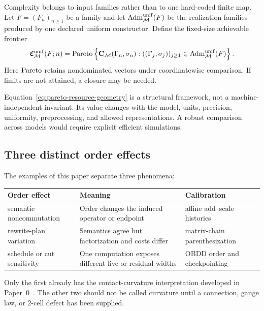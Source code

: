 Complexity belongs to input families rather than to one hard-coded finite map.
Let $F=(F_n)_{n\ge1}$ be a family and let
$\operatorname{Adm}^{\mathrm{unif}}_{\mathcal M}(F)$ be the realization families
produced by one declared uniform constructor.  Define the fixed-size achievable
frontier
\begin{equation}
 \mathfrak C_{\mathcal M}^{\mathrm{unif}}(F;n)
 =\operatorname{Pareto}\left\{
 \mathbf C_{\mathcal M}(\Gamma_n,\sigma_n):
 ((\Gamma_j,\sigma_j))_{j\ge1}
 \in\operatorname{Adm}^{\mathrm{unif}}_{\mathcal M}(F)
 \right\}.
 \label{eq:pareto-resource-geometry}
\end{equation}
Here $\operatorname{Pareto}$ retains nondominated vectors under coordinatewise comparison.
If limits are not attained, a closure may be needed.

Equation~\eqref{eq:pareto-resource-geometry} is a structural framework, not a
machine-independent invariant.  Its value changes with the model, units,
precision, uniformity, preprocessing, and allowed representations.  A robust
comparison across models would require explicit efficient simulations.

\subsection{Three distinct order effects}

The examples of this paper separate three phenomena:

\begin{center}
\begin{tabular}{L{0.25\textwidth}L{0.35\textwidth}L{0.28\textwidth}}
\toprule
Order effect & Meaning & Calibration\\
\midrule
semantic noncommutation & Order changes the induced operator or endpoint & affine add--scale histories\\
rewrite-plan variation & Semantics agree but factorization and costs differ & matrix-chain parenthesization\\
schedule or cut sensitivity & One computation exposes different live or residual widths & OBDD order and checkpointing\\
\bottomrule
\end{tabular}
\end{center}

Only the first already has the contact-curvature interpretation developed in
Paper~0~\cite{Yuan2026AEGPaperZero}.  The other two should not be called
curvature until a connection, gauge law, or $2$-cell defect has been supplied.
